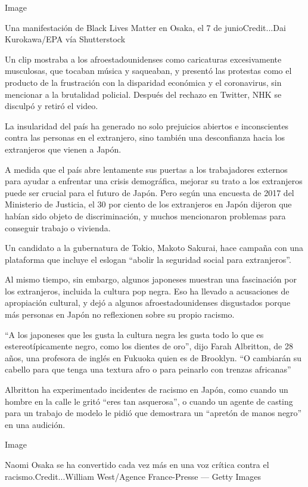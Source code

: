 Image

Una manifestación de Black Lives Matter en Osaka, el 7 de
junioCredit...Dai Kurokawa/EPA vía Shutterstock

Un clip mostraba a los afroestadounidenses como caricaturas
excesivamente musculosas, que tocaban música y saqueaban, y presentó las
protestas como el producto de la frustración con la disparidad económica
y el coronavirus, sin mencionar a la brutalidad policial. Después del
rechazo en Twitter, NHK se disculpó y retiró el video.

La insularidad del país ha generado no solo prejuicios abiertos e
inconscientes contra las personas en el extranjero, sino también una
desconfianza hacia los extranjeros que vienen a Japón.

A medida que el país abre lentamente sus puertas a los trabajadores
externos para ayudar a enfrentar una crisis demográfica, mejorar su
trato a los extranjeros puede ser crucial para el futuro de Japón. Pero
según una encuesta de 2017 del Ministerio de Justicia, el 30 por ciento
de los extranjeros en Japón dijeron que habían sido objeto de
discriminación, y muchos mencionaron problemas para conseguir trabajo o
vivienda.

Un candidato a la gubernatura de Tokio, Makoto Sakurai, hace campaña con
una plataforma que incluye el eslogan ``abolir la seguridad social para
extranjeros''.

Al mismo tiempo, sin embargo, algunos japoneses muestran una fascinación
por los extranjeros, incluida la cultura pop negra. Eso ha llevado a
acusaciones de apropiación cultural, y dejó a algunos
afroestadounidenses disgustados porque más personas en Japón no
reflexionen sobre su propio racismo.

``A los japoneses que les gusta la cultura negra les gusta todo lo que
es estereotípicamente negro, como los dientes de oro'', dijo Farah
Albritton, de 28 años, una profesora de inglés en Fukuoka quien es de
Brooklyn. ``O cambiarán su cabello para que tenga una textura afro o
para peinarlo con trenzas africanas''

Albritton ha experimentado incidentes de racismo en Japón, como cuando
un hombre en la calle le gritó ``eres tan asquerosa'', o cuando un
agente de casting para un trabajo de modelo le pidió que demostrara un
``apretón de manos negro'' en una audición.

Image

Naomi Osaka se ha convertido cada vez más en una voz crítica contra el
racismo.Credit...William West/Agence France-Presse --- Getty Images

